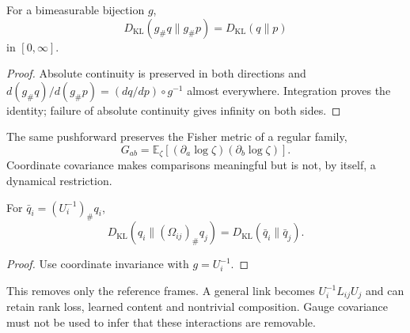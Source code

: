 \begin{proposition}\label{thm:glk_invariance}
For a bimeasurable bijection $g$,
\begin{equation}
D_{\mathrm{KL}}(g_\#q\|g_\#p)=D_{\mathrm{KL}}(q\|p)
\label{eq:glk_invariance}
\end{equation}
in $[0,\infty]$.
\end{proposition}
\begin{proof}
Absolute continuity is preserved in both directions and
$d(g_\#q)/d(g_\#p)=(dq/dp)\circ g^{-1}$ almost everywhere. Integration proves the identity; failure of absolute continuity gives infinity on both sides.
\end{proof}
The same pushforward preserves the Fisher metric of a regular family,
\begin{equation}
G_{ab}=\mathbb E_\zeta[(\partial_a\log\zeta)(\partial_b\log\zeta)].
\end{equation}
Coordinate covariance makes comparisons meaningful but is not, by itself, a dynamical restriction.

\begin{proposition}\label{prop:regime1_removability}
For $\bar q_i=(U_i^{-1})_\#q_i$,
\begin{equation}
D_{\mathrm{KL}}(q_i\|(\Omega_{ij})_\#q_j)
=D_{\mathrm{KL}}(\bar q_i\|\bar q_j).
\label{eq:regime1_removability}
\end{equation}
\end{proposition}
\begin{proof}
Use coordinate invariance with $g=U_i^{-1}$.
\end{proof}
This removes only the reference frames. A general link becomes $U_i^{-1}L_{ij}U_j$ and can retain rank loss, learned content and nontrivial composition. Gauge covariance must not be used to infer that these interactions are removable.

